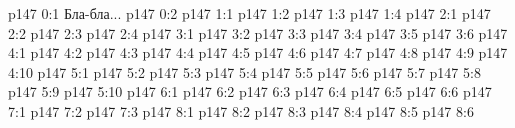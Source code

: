 \author{Промежуточные создания}
\vs p147 0:1  Бла-бла...
\vs p147 0:2 
\vs p147 1:1 
\vs p147 1:2 
\vs p147 1:3 
\vs p147 1:4 
\vs p147 2:1 
\vs p147 2:2 
\vs p147 2:3 
\vs p147 2:4 
\vs p147 3:1 
\vs p147 3:2 
\vs p147 3:3 
\vs p147 3:4 
\vs p147 3:5 
\vs p147 3:6 
\vs p147 4:1 
\vs p147 4:2 
\vs p147 4:3 
\vs p147 4:4 
\vs p147 4:5 \pc 
\vs p147 4:6 \pc 
\vs p147 4:7 \pc 
\vs p147 4:8 \pc 
\vs p147 4:9 \pc 
\vs p147 4:10 \pc 
{}
\vs p147 5:1 
\vs p147 5:2 
\vs p147 5:3 
\vs p147 5:4 
\vs p147 5:5 \pc 
\vs p147 5:6 
\vs p147 5:7 \pc 
\vs p147 5:8 
\vs p147 5:9 
\vs p147 5:10 \pc 
{}
\vs p147 6:1 
\vs p147 6:2 
\vs p147 6:3 \pc 
\vs p147 6:4 
\vs p147 6:5 
\vs p147 6:6 \pc 
{}
\vs p147 7:1 
\vs p147 7:2 
\vs p147 7:3 
\vs p147 8:1 
\vs p147 8:2 \pc 
\vs p147 8:3 
\vs p147 8:4 
\vs p147 8:5 \pc 
\vs p147 8:6 
\quizlink
